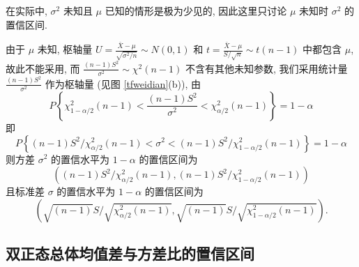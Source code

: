 在实际中, $\sigma^{2} $ 未知且 $ \mu $ 已知的情形是极为少见的, 因此这里只讨论 $ \mu $ 未知时 $ \sigma^{2} $ 的置信区间.

\begin{theorem}
    由于 $ \mu $ 未知, 枢轴量 $\displaystyle U=\frac{\bar{X}-\mu}{\sqrt{\sigma^{2} / n}} \sim N(0,1) $ 和 $\displaystyle t=\frac{\bar{X}-\mu}{S / \sqrt{n}} \sim t(n-1) $ 中都包含 $ \mu$, 
    故此不能采用, 而 $\displaystyle \frac{(n-1) S^{2}}{\sigma^{2}} \sim \chi^{2}(n-1) $ 不含有其他未知参数, 
    我们采用统计量 $\displaystyle \frac{(n-1) S^{2}}{\sigma^{2}} $ 作为枢轴量 (见图 \ref{tfweidian}(b)), 由
    $$P\left\{\chi_{1-\alpha / 2}^{2}(n-1)<\frac{(n-1) S^{2}}{\sigma^{2}}<\chi_{\alpha / 2}^{2}(n-1)\right\}=1-\alpha$$
    即
    $$P\left\{(n-1) S^{2} / \chi_{\alpha / 2}^{2}(n-1)<\sigma^{2}<(n-1) S^{2} / \chi_{1-\alpha / 2}^{2}(n-1)\right\}=1-\alpha$$
    则方差 $ \sigma^{2} $ 的置信水平为 $ 1-\alpha $ 的置信区间为
    $$\left((n-1) S^{2} / \chi_{\alpha / 2}^{2}(n-1),(n-1) S^{2} / \chi_{1-\alpha / 2}^{2}(n-1)\right)$$
    且标准差 $ \sigma $ 的置信水平为 $ 1-\alpha $ 的置信区间为
    $$\left(\sqrt{(n-1)} S / \sqrt{\chi_{\alpha / 2}^{2}(n-1)}, \sqrt{(n-1)} S / \sqrt{\chi_{1-\alpha / 2}^{2}(n-1)}\right) .$$
\end{theorem}

\subsection{双正态总体均值差与方差比的置信区间}


